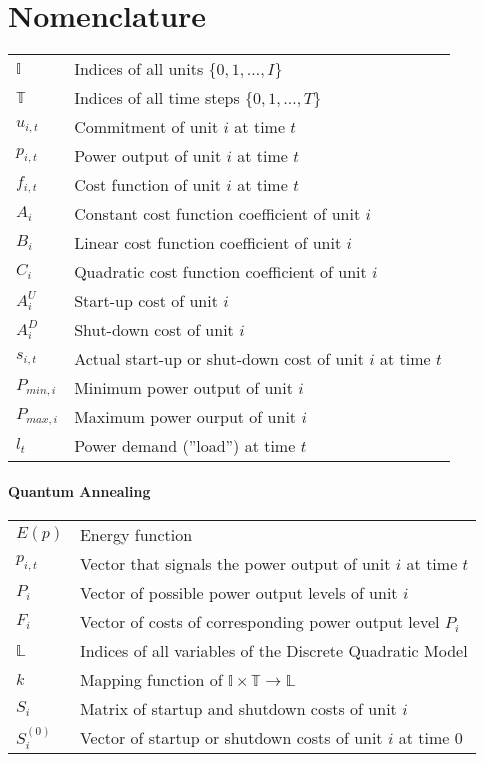 \chapter*{Nomenclature}

\begin{tabular}{ll}
  $\mathbb{I}$ & Indices of all units $\{0, 1, \ldots, I\}$\\
  $\mathbb{T}$ & Indices of all time steps $\{0, 1, \ldots, T\}$ \\
  $u_{i, t}$ & Commitment of unit $i$ at time $t$ \\
  $p_{i, t}$ & Power output of unit $i$ at time $t$ \\
  $f_{i, t}$ & Cost function of unit $i$ at time $t$ \\
  $A_i$ & Constant cost function coefficient of unit $i$ \\
  $B_i$ & Linear cost function coefficient of unit $i$ \\
  $C_i$ & Quadratic cost function coefficient of unit $i$ \\
  $A^U_i$ & Start-up cost of unit $i$ \\
  $A^D_i$ & Shut-down cost of unit $i$ \\
  $s_{i, t}$ & Actual start-up or shut-down cost of unit $i$ at time $t$ \\
  $P_{min, i}$ & Minimum power output of unit $i$ \\
  $P_{max, i}$ & Maximum power ourput of unit $i$ \\
  $l_t$ & Power demand (''load'') at time $t$
\end{tabular}

\subsubsection{Quantum Annealing}

\begin{tabular}{ll}
  $E(p)$ & Energy function \\
  $p_{i, t}$ & Vector that signals the power output of unit $i$ at time $t$ \\
  $P_{i}$ & Vector of possible power output levels of unit $i$ \\
  $F_{i}$ & Vector of costs of corresponding power output level $P_{i}$ \\
  $\mathbb{L}$ & Indices of all variables of the Discrete Quadratic Model \\
  $k$ & Mapping function of $\mathbb{I} \times \mathbb{T} \to \mathbb{L}$ \\
  $S_{i}$ & Matrix of startup and shutdown costs of unit $i$ \\
  $S_i^{(0)}$ & Vector of startup or shutdown costs of unit $i$ at time $0$
\end{tabular}

